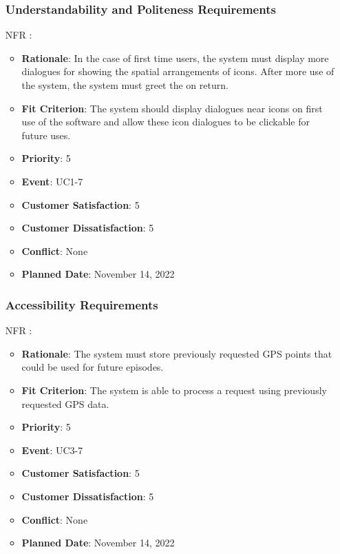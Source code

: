 \documentclass[12pt, titlepage]{article}
\newcounter{reqnum} %
\newcounter{freqnum} %
\begin{document}
\begin{itemize}
\subsubsection{Understandability and Politeness Requirements}
\item[NFR\refstepcounter{freqnum}\thefreqnum
\label{NFR}:] 
\begin{itemize}
    \item \textbf{Rationale}: In the case of first time users, the system must display more dialogues for showing the spatial arrangements of icons. After more use of the system, the system must greet the on return.
    \item \textbf{Fit Criterion}: The system should display dialogues near icons on first use of the software and allow these icon dialogues to be clickable for future uses. 
    \item \textbf{Priority}: 5
    \item \textbf{Event}: UC1-7%
    \item \textbf{Customer Satisfaction}: 5
    \item \textbf{Customer Dissatisfaction}: 5
    \item \textbf{Conflict}: None
    \item \textbf{Planned Date}: November 14, 2022
\end{itemize}
\subsubsection{Accessibility Requirements}
\item[NFR\refstepcounter{freqnum}\thefreqnum
\label{NFR}:] 
\begin{itemize}
    \item \textbf{Rationale}: The system must store previously requested GPS points that could be used for future episodes.
    \item \textbf{Fit Criterion}: The system is able to process a request using previously requested GPS data.
    \item \textbf{Priority}: 5
    \item \textbf{Event}: UC3-7%
    \item \textbf{Customer Satisfaction}: 5
    \item \textbf{Customer Dissatisfaction}: 5
    \item \textbf{Conflict}: None
    \item \textbf{Planned Date}: November 14, 2022
\end{itemize}

\end{itemize}
\end{document}
